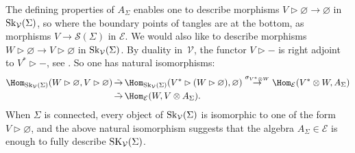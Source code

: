 \begin{Remark}\label{rmkTopPtsAndASigma}
The defining properties of $A_\Sigma$ enables one to describe morphisms $V \rhd \varnothing \to \varnothing$ in ${\rm Sk}_\mathcal{V}(\Sigma)$, so where the boundary points of tangles are at the bottom, as morphisms $V \to \mathscr{S}(\Sigma)$ in $\mathcal{E}$. We would also like to describe morphisms $W\rhd \varnothing \to V \rhd \varnothing$ in ${\rm Sk}_\mathcal{V}(\Sigma)$. By duality in~$\mathcal{V}$, the functor $V\rhd-$ is right adjoint to $V^*\rhd-$, see \cite[Proposition~7.1.6]{EGNO}. So one has natural isomorphisms:
\begin{align*}
\Hom_{{\rm Sk}_\mathcal{V}(\Sigma)}(W\rhd\varnothing, V \rhd\varnothing) &\,\tilde{\to} \, \Hom_{{\rm Sk}_\mathcal{V}(\Sigma)}(V^*\rhd( W \rhd \varnothing), \varnothing) \overset{\sigma_{V^*\otimes W}}{\to} \Hom_{\mathcal{E}}(V^*\otimes W, A_\Sigma)
\\
&\, \tilde{\to} \, \Hom_{\mathcal{E}}(W,V\otimes A_\Sigma).
\end{align*}
When $\Sigma$ is connected, every object of ${\rm Sk}_\mathcal{V}(\Sigma)$ is isomorphic to one of the form $V\rhd\varnothing$, and the above natural isomorphism suggests that the algebra $A_\Sigma\in\mathcal{E}$ is enough to fully describe ${\rm SK}_\mathcal{V}(\Sigma)$.
\end{Remark}
